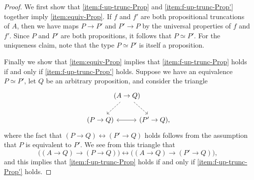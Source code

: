\begin{proof}
  We first show that \ref{item:f-up-trunc-Prop} and \ref{item:f-up-trunc-Prop'} together imply \ref{item:equiv-Prop}. If $f$ and $f'$ are both propositional truncations of $A$, then we have maps $P\to P'$ and $P'\to P$ by the universal properties of $f$ and $f'$. Since $P$ and $P'$ are both propositions, it follows that $P\simeq P'$. For the uniqueness claim, note that the type $P\simeq P'$ is itself a proposition.

  Finally we show that \ref{item:equiv-Prop} implies that \ref{item:f-up-trunc-Prop} holds if and only if \ref{item:f-up-trunc-Prop'} holds. Suppose we have an equivalence $P\simeq P'$, let $Q$ be an arbitrary proposition, and consider the triangle
  \begin{equation*}
    \begin{tikzcd}[column sep=-1em]
      \phantom{(P'\to Q)} & (A\to Q) \arrow[dl,dashed] \arrow[dr,dashed] \\
      (P\to Q) \arrow[rr,<->] & & (P'\to Q),
    \end{tikzcd}
  \end{equation*}
  where the fact that $(P\to Q)\leftrightarrow (P'\to Q)$ holds follows from the assumption that $P$ is equivalent to $P'$. We see from this triangle that
  \begin{equation*}
    \Big((A\to Q)\to (P\to Q)\Big)\leftrightarrow\Big((A \to Q) \to (P'\to Q)\Big),
  \end{equation*}
  and this implies that \ref{item:f-up-trunc-Prop} holds if and only if \ref{item:f-up-trunc-Prop'} holds.
\end{proof}

